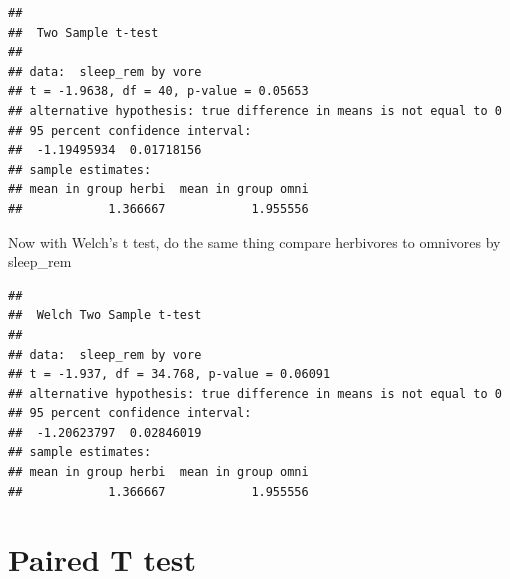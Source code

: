\documentclass[
]{book}
\newenvironment{Shaded}{\begin{snugshade}}{\end{snugshade}}
\newcommand{\CommentTok}[1]{\textcolor[rgb]{0.56,0.35,0.01}{\textit{#1}}}
\newcommand{\DataTypeTok}[1]{\textcolor[rgb]{0.13,0.29,0.53}{#1}}
\newcommand{\KeywordTok}[1]{\textcolor[rgb]{0.13,0.29,0.53}{\textbf{#1}}}
\newcommand{\NormalTok}[1]{#1}
\newcommand{\OperatorTok}[1]{\textcolor[rgb]{0.81,0.36,0.00}{\textbf{#1}}}
\newcommand{\OtherTok}[1]{\textcolor[rgb]{0.56,0.35,0.01}{#1}}
\newcommand{\StringTok}[1]{\textcolor[rgb]{0.31,0.60,0.02}{#1}}
\begin{document}
\begin{verbatim}
## 
##  Two Sample t-test
## 
## data:  sleep_rem by vore
## t = -1.9638, df = 40, p-value = 0.05653
## alternative hypothesis: true difference in means is not equal to 0
## 95 percent confidence interval:
##  -1.19495934  0.01718156
## sample estimates:
## mean in group herbi  mean in group omni 
##            1.366667            1.955556
\end{verbatim}

Now with Welch's t test, do the same thing
compare herbivores to omnivores by sleep\_rem

\begin{Shaded}
\end{Shaded}

\begin{verbatim}
## 
##  Welch Two Sample t-test
## 
## data:  sleep_rem by vore
## t = -1.937, df = 34.768, p-value = 0.06091
## alternative hypothesis: true difference in means is not equal to 0
## 95 percent confidence interval:
##  -1.20623797  0.02846019
## sample estimates:
## mean in group herbi  mean in group omni 
##            1.366667            1.955556
\end{verbatim}

\hypertarget{paired-t-test}{%
\section{Paired T test}\label{paired-t-test}}

\begin{Shaded}
\end{Shaded}
\end{document}

